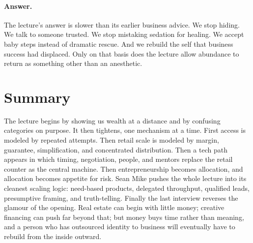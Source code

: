 \paragraph{Answer.} The lecture's answer is slower than its earlier business advice. We stop hiding. We talk to someone trusted. We stop mistaking sedation for healing. We accept baby steps instead of dramatic rescue. And we rebuild the self that business success had displaced. Only on that basis does the lecture allow abundance to return as something other than an anesthetic.

\section{Summary}

The lecture begins by showing us wealth at a distance and by confusing categories on purpose. It then tightens, one mechanism at a time. First access is modeled by repeated attempts. Then retail scale is modeled by margin, guarantee, simplification, and concentrated distribution. Then a tech path appears in which timing, negotiation, people, and mentors replace the retail counter as the central machine. Then entrepreneurship becomes allocation, and allocation becomes appetite for risk. Sean Mike pushes the whole lecture into its cleanest scaling logic: need-based products, delegated throughput, qualified leads, presumptive framing, and truth-telling. Finally the last interview reverses the glamour of the opening. Real estate can begin with little money; creative financing can push far beyond that; but money buys time rather than meaning, and a person who has outsourced identity to business will eventually have to rebuild from the inside outward.